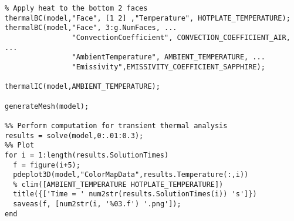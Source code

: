 \begin{lstlisting}
% Apply heat to the bottom 2 faces
thermalBC(model,"Face", [1 2] ,"Temperature", HOTPLATE_TEMPERATURE);
thermalBC(model,"Face", 3:g.NumFaces, ...
                "ConvectionCoefficient", CONVECTION_COEFFICIENT_AIR, ...
                "AmbientTemperature", AMBIENT_TEMPERATURE, ...
                "Emissivity",EMISSIVITY_COEFFICIENT_SAPPHIRE);

thermalIC(model,AMBIENT_TEMPERATURE);

generateMesh(model);

%% Perform computation for transient thermal analysis
results = solve(model,0:.01:0.3);
%% Plot
for i = 1:length(results.SolutionTimes)
  f = figure(i+5);
  pdeplot3D(model,"ColorMapData",results.Temperature(:,i))
  % clim([AMBIENT_TEMPERATURE HOTPLATE_TEMPERATURE])
  title({['Time = ' num2str(results.SolutionTimes(i)) 's']})
  saveas(f, [num2str(i, '%03.f') '.png']);
end



\end{lstlisting}
